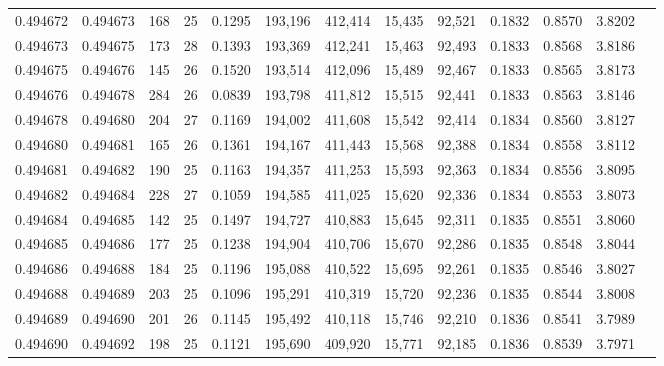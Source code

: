 \begin{tabular}{rrrrrrrrrrrrr}
0.494672 & 0.494673 & 168 &  25 &                                     0.1295 & 193,196 & 412,414 &  15,435 &  92,521 & 0.1832 & 0.8570 & 3.8202 \\
0.494673 & 0.494675 & 173 &  28 &                                     0.1393 & 193,369 & 412,241 &  15,463 &  92,493 & 0.1833 & 0.8568 & 3.8186 \\
0.494675 & 0.494676 & 145 &  26 &                                     0.1520 & 193,514 & 412,096 &  15,489 &  92,467 & 0.1833 & 0.8565 & 3.8173 \\
0.494676 & 0.494678 & 284 &  26 &                                     0.0839 & 193,798 & 411,812 &  15,515 &  92,441 & 0.1833 & 0.8563 & 3.8146 \\
0.494678 & 0.494680 & 204 &  27 &                                     0.1169 & 194,002 & 411,608 &  15,542 &  92,414 & 0.1834 & 0.8560 & 3.8127 \\
0.494680 & 0.494681 & 165 &  26 &                                     0.1361 & 194,167 & 411,443 &  15,568 &  92,388 & 0.1834 & 0.8558 & 3.8112 \\
0.494681 & 0.494682 & 190 &  25 &                                     0.1163 & 194,357 & 411,253 &  15,593 &  92,363 & 0.1834 & 0.8556 & 3.8095 \\
0.494682 & 0.494684 & 228 &  27 &                                     0.1059 & 194,585 & 411,025 &  15,620 &  92,336 & 0.1834 & 0.8553 & 3.8073 \\
0.494684 & 0.494685 & 142 &  25 &                                     0.1497 & 194,727 & 410,883 &  15,645 &  92,311 & 0.1835 & 0.8551 & 3.8060 \\
0.494685 & 0.494686 & 177 &  25 &                                     0.1238 & 194,904 & 410,706 &  15,670 &  92,286 & 0.1835 & 0.8548 & 3.8044 \\
0.494686 & 0.494688 & 184 &  25 &                                     0.1196 & 195,088 & 410,522 &  15,695 &  92,261 & 0.1835 & 0.8546 & 3.8027 \\
0.494688 & 0.494689 & 203 &  25 &                                     0.1096 & 195,291 & 410,319 &  15,720 &  92,236 & 0.1835 & 0.8544 & 3.8008 \\
0.494689 & 0.494690 & 201 &  26 &                                     0.1145 & 195,492 & 410,118 &  15,746 &  92,210 & 0.1836 & 0.8541 & 3.7989 \\
0.494690 & 0.494692 & 198 &  25 &                                     0.1121 & 195,690 & 409,920 &  15,771 &  92,185 & 0.1836 & 0.8539 & 3.7971 \\

\end{tabular}
